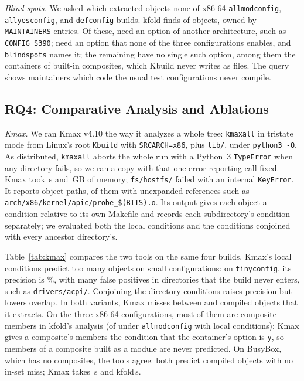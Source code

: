 \documentclass[acmsmall]{acmart}
\newcommand{\tool}{\textsf{kfold}\xspace}
\newcommand{\kmax}{\textsf{Kmax}\xspace}
\newcounter{none}
\begin{document}
\emph{Blind spots.} We asked which extracted objects none of x86-64 \texttt{allmodconfig}, \texttt{allyesconfig}, and \texttt{defconfig} builds.
\tool finds \NBlindBlindSpots of \NBlindObjectsConsidered objects, owned by \NBlindEntriesWithBlindSpots \texttt{MAINTAINERS} entries.
Of these, \NBlindArch need an option of another architecture, such as \texttt{CONFIG\_S390}; \NBlindNotenabled need an option that none of the three configurations enables, and \texttt{blindspots} names it; the remaining \NBlindNopivot have no single such option, among them the containers of built-in composites, which Kbuild never writes as files.
The query shows maintainers which code the usual test configurations never compile.

\subsection{RQ4: Comparative Analysis and Ablations}
\label{sec:eval:comparative}
\emph{\kmax.} We ran \kmax v4.10 the way it analyzes a whole tree: \texttt{kmaxall} in tristate mode from Linux's root \texttt{Kbuild} with \texttt{SRCARCH=x86}, plus \texttt{lib/}, under \texttt{python3 -O}.
As distributed, \texttt{kmaxall} aborts the whole run with a Python~3 \texttt{TypeError} when any directory fails, so we ran a copy with that one error-reporting call fixed.
\kmax took \NLinuxKmaxSeconds\,s and \NLinuxKmaxRssGb\,GB of memory; \texttt{fs/hostfs/} failed with an internal \texttt{KeyError}.
It reports \NLinuxKmaxObjects object paths, \NLinuxKmaxUnexpanded of them with unexpanded references such as \texttt{arch/x86/kernel/apic/probe\_\$(BITS).o}.
Its output gives each object a condition relative to its own Makefile and records each subdirectory's condition separately; we evaluated both the local conditions and the conditions conjoined with every ancestor directory's.

Table~\ref{tab:kmax} compares the two tools on the same four builds.
\kmax's local conditions predict too many objects on small configurations: on \texttt{tinyconfig}, its precision is \NLinuxKmaxTinyconfigLocalPrec\%, with many false positives in directories that the build never enters, such as \texttt{drivers/acpi/}.
Conjoining the directory conditions raises precision but lowers overlap.
In both variants, \kmax misses between \NLinuxKmaxTinyconfigLocalFn and \NLinuxKmaxAllmodconfigWithDirsFn compiled objects that it extracts.
On the three x86-64 configurations, most of them are composite members in \tool's analysis (\NLinuxKmaxAllmodconfigLocalFnMembers of \NLinuxKmaxAllmodconfigLocalFn under \texttt{allmodconfig} with local conditions): \kmax gives a composite's members the condition that the container's option is \texttt{y}, so members of a composite built as a module are never predicted.
On BusyBox, which has no composites, the tools agree: both predict \NBusyboxKmaxDefconfigLocalTp compiled objects with no in-set miss; \kmax takes \NBusyboxKmaxSeconds\,s and \tool \NBusyboxSeconds\,s.
\end{document}
